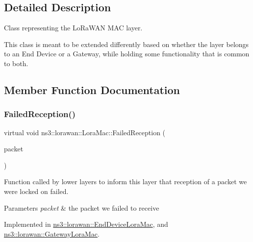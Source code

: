 \subsection{Detailed Description}
Class representing the Lo\+Ra\+W\+AN M\+AC layer.

This class is meant to be extended differently based on whether the layer belongs to an End Device or a Gateway, while holding some functionality that is common to both. 

\subsection{Member Function Documentation}
\mbox{\label{classns3_1_1lorawan_1_1LoraMac_afcd55472bbfa299c4d0239d5fa9957e3}} 
\subsubsection{\texorpdfstring{Failed\+Reception()}{FailedReception()}}
{\footnotesize\ttfamily virtual void ns3\+::lorawan\+::\+Lora\+Mac\+::\+Failed\+Reception (\begin{DoxyParamCaption}\item[{Ptr$<$ Packet const $>$}]{packet }\end{DoxyParamCaption})\hspace{0.3cm}{\ttfamily [pure virtual]}}

Function called by lower layers to inform this layer that reception of a packet we were locked on failed.


\begin{DoxyParams}{Parameters}
{\em packet} & the packet we failed to receive \\
\hline
\end{DoxyParams}


Implemented in \hyperlink{classns3_1_1lorawan_1_1EndDeviceLoraMac_ab1fe806e8a0f5aa3a17fd1c39e831d44}{ns3\+::lorawan\+::\+End\+Device\+Lora\+Mac}, and \hyperlink{classns3_1_1lorawan_1_1GatewayLoraMac_a2d752f0ff766d409e1eb91d7bcd06ad5}{ns3\+::lorawan\+::\+Gateway\+Lora\+Mac}.

\mbox{\label{classns3_1_1lorawan_1_1LoraMac_a0b17634f15b5808b0fa992464f0197d0}} 
